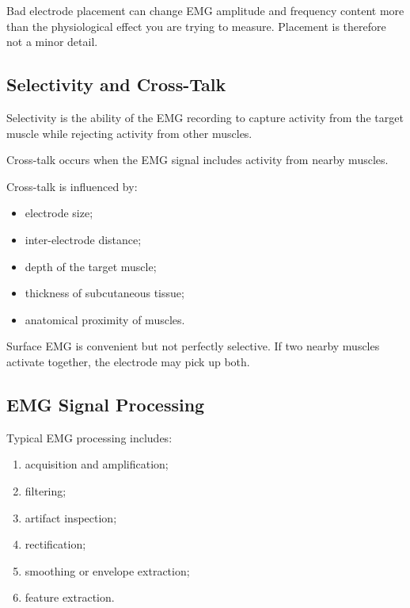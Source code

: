 \begin{authornote}
Bad electrode placement can change EMG amplitude and frequency content more than the physiological effect you are trying to measure. Placement is therefore not a minor detail.
\end{authornote}

\subsection{Selectivity and Cross-Talk}

Selectivity is the ability of the EMG recording to capture activity from the target muscle while rejecting activity from other muscles.

Cross-talk occurs when the EMG signal includes activity from nearby muscles.

Cross-talk is influenced by:

\begin{itemize}[noitemsep]
    \item electrode size;
    \item inter-electrode distance;
    \item depth of the target muscle;
    \item thickness of subcutaneous tissue;
    \item anatomical proximity of muscles.
\end{itemize}

\begin{authornote}
Surface EMG is convenient but not perfectly selective. If two nearby muscles activate together, the electrode may pick up both.
\end{authornote}

\subsection{EMG Signal Processing}

Typical EMG processing includes:

\begin{enumerate}[noitemsep]
    \item acquisition and amplification;
    \item filtering;
    \item artifact inspection;
    \item rectification;
    \item smoothing or envelope extraction;
    \item feature extraction.
\end{enumerate}

